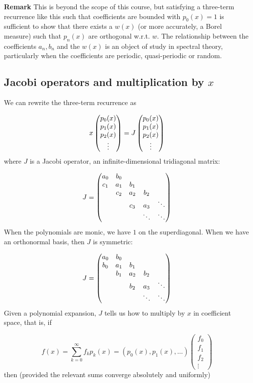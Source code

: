 \documentclass[12pt,a4paper]{article}
\begin{document}
\textbf{Remark} This is beyond the scope of this course, but satisfying a three-term recurrence like this such that coefficients are bounded with $p_0(x) = 1$ is sufficient to show that there exists a $w(x)$ (or more accurately, a Borel measure) such that $p_n(x)$ are orthogonal w.r.t. $w$. The relationship between the coefficients $a_n,b_n$ and the $w(x)$ is an object of study in spectral theory, particularly when the coefficients are periodic, quasi-periodic or random.

\subsection{Jacobi operators and multiplication by $x$}
We can rewrite the three-term recurrence as

\[
x \begin{pmatrix} p_0(x) \cr p_1(x) \cr p_2(x) \cr \vdots \end{pmatrix} = J\begin{pmatrix} p_0(x) \cr p_1(x) \cr p_2(x) \cr \vdots \end{pmatrix}
\]
where $J$ is a Jacobi operator, an infinite-dimensional tridiagonal matrix:

\[
J = \begin{pmatrix}
a_0 & b_0 \cr
c_1 & a_1 & b_1 \cr
& c_2 & a_2 & b_2 \cr
&& c_3 & a_3 & \ddots \cr
&&&\ddots & \ddots
\end{pmatrix}
\]
When the polynomials are monic, we have $1$ on the superdiagonal.  When we have an orthonormal basis, then $J$ is symmetric:

\[
J = \begin{pmatrix}
a_0 & b_0 \cr
b_0 & a_1 & b_1 \cr
& b_1 & a_2 & b_2 \cr
&& b_2 & a_3 & \ddots \cr
&&&\ddots & \ddots
\end{pmatrix}
\]
Given a polynomial expansion, $J$ tells us how to multiply by $x$ in coefficient space, that is, if

\[
f(x) = \sum_{k=0}^\infty f_k p_k(x) =   (p_0(x) ,  p_1(x) , \ldots ) \begin{pmatrix}f_0\\ f_1\\f_2\\\vdots\end{pmatrix}
\]
then (provided the relevant sums converge absolutely and uniformly)
\end{document}
